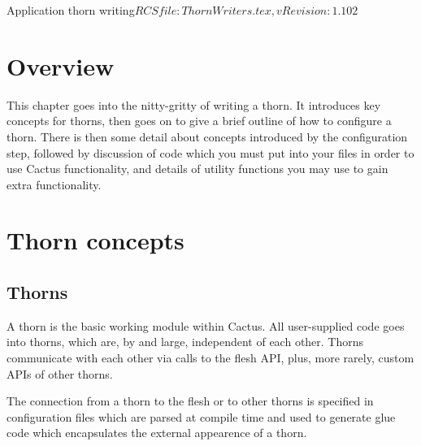 
\begin{cactuspart}{2}{Application thorn writing}{$RCSfile: ThornWriters.tex,v $}{$Revision: 1.102 $}

\renewcommand{\thepage}{\Alph{part}\arabic{page}}

\chapter{Overview}

This chapter goes into the nitty-gritty of writing a thorn.
It introduces key concepts for thorns, then goes on to give
a brief outline of how to configure a thorn.
There is then some detail about concepts introduced by the configuration
step, followed by discussion of code which you must put into your files
in order to use Cactus functionality, and details of utility functions
you may use to gain extra functionality.



\chapter{Thorn concepts}



\section{Thorns}

A thorn is the basic working module within Cactus.  All user-supplied
code goes into thorns, which are, by and large, independent of each other.
Thorns communicate with each other via calls to the flesh API, plus, more
rarely, custom APIs of other thorns.

The connection from a thorn to the flesh or to other thorns is specified in
configuration files which are parsed at compile time and used to generate
glue code which encapsulates the external appearence of a thorn.


\end{cactuspart}
